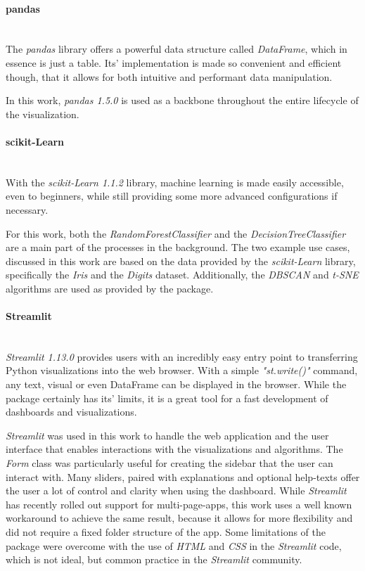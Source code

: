 \documentclass[a4paper, 12pt]{article}
\begin{document}
\paragraph{pandas}\mbox{}\\
The \textit{pandas} library offers a powerful data structure called \textit{DataFrame}, which in
essence is just a table. Its' implementation is made so convenient and efficient though, that it
allows for both intuitive and performant data manipulation. \par
In this work, \textit{pandas 1.5.0} is used as a backbone throughout the entire lifecycle of the
visualization.

\paragraph{scikit-Learn}\mbox{}\\
With the \textit{scikit-Learn 1.1.2} library, machine learning is made easily accessible, even to
beginners, while still providing some more advanced configurations if necessary. \par
For this work, both the \textit{RandomForestClassifier} and the \textit{DecisionTreeClassifier}
are a main part of the processes in the background. The two example use cases, discussed in this
work are based on the data provided by the \textit{scikit-Learn} library, specifically the
\textit{Iris} and the \textit{Digits} dataset. Additionally, the \textit{DBSCAN}
\cite{ester1996density} and \textit{t-SNE} \cite{JMLR:v9:vandermaaten08a} algorithms are used as
provided by the package.

\paragraph{Streamlit}\mbox{}\\
\textit{Streamlit 1.13.0} provides users with an incredibly easy entry point to transferring Python
visualizations into the web browser. With a simple \textit{"st.write()"} command, any text,
visual or even {DataFrame} can be displayed in the browser. While the package certainly has its'
limits, it is a great tool for a fast development of dashboards and visualizations. \par
\textit{Streamlit} was used in this work to handle the web application and the user interface
that enables interactions with the visualizations and algorithms. The \textit{Form} class was
particularly useful for creating the sidebar that the user can interact with. Many sliders, paired
with explanations and optional help-texts offer the user a lot of control and clarity when using
the dashboard.
While \textit{Streamlit} has
recently rolled out support for multi-page-apps, this work uses a well known workaround to
achieve the same result, because it allows for more flexibility and did not require a fixed folder
structure of the app.
Some limitations of the package were overcome with the use of \textit{HTML} and \textit{CSS} in
the \textit{Streamlit} code, which is not ideal, but common practice in the \textit{Streamlit}
community.
\end{document}
